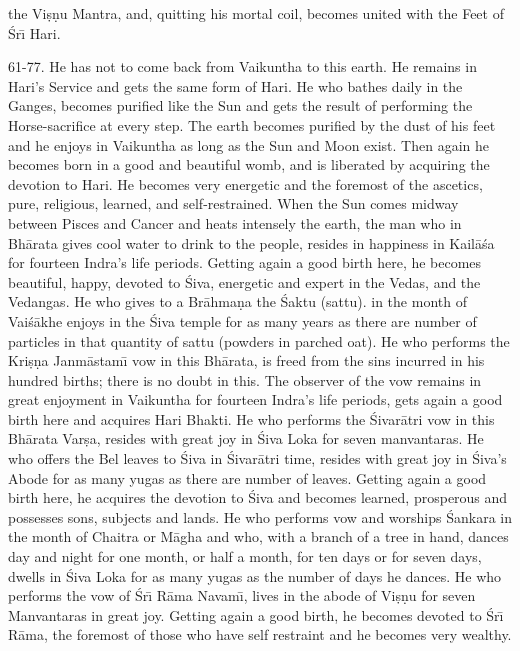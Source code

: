 the Vi\d{s}\d{n}u Mantra, and, quitting his mortal coil, becomes united with the Feet of \'Sr\={\i} Hari.

61-77. He has not to come back from Vaikuntha to this earth. He remains in Hari's Service and gets the same form of Hari. He who bathes daily in the Ganges, becomes purified like the Sun and gets the result of performing the Horse-sacrifice at every step. The earth becomes purified by the dust of his feet and he enjoys in Vaikuntha as long as the Sun and Moon exist. Then again he becomes born in a good and beautiful womb, and is liberated by acquiring the devotion to Hari. He becomes very energetic and the foremost of the ascetics, pure, religious, learned, and self-restrained. When the Sun comes midway between Pisces and Cancer and heats intensely the earth, the man who in Bh\=arata gives cool water to drink to the people, resides in happiness in Kail\=a\'sa for fourteen Indra's life periods. Getting again a good birth here, he becomes beautiful, happy, devoted to \'Siva, energetic and expert in the Vedas, and the Vedangas. He who gives to a Br\=ahma\d{n}a the \'Saktu (sattu). in the month of Vai\'s\=akhe enjoys in the \'Siva temple for as many years as there are number of particles in that quantity of sattu (powders in parched oat). He who performs the Kri\d{s}\d{n}a Janm\=astam\={\i} vow in this Bh\=arata, is freed from the sins incurred in his hundred births; there is no doubt in this. The observer of the vow remains in great enjoyment in Vaikuntha for fourteen Indra's life periods, gets again a good birth here and acquires Hari Bhakti. He who performs the \'Sivar\=atri vow in this Bh\=arata Var\d{s}a, resides with great joy in \'Siva Loka for seven manvantaras. He who offers the Bel leaves to \'Siva in \'Sivar\=atri time, resides with great joy in \'Siva's Abode for as many yugas as there are number of leaves. Getting again a good birth here, he acquires the devotion to \'Siva and becomes learned, prosperous and possesses sons, subjects and lands. He who performs vow and worships \'Sankara in the month of Chaitra or M\=agha and who, with a branch of a tree in hand, dances day and night for one month, or half a month, for ten days or for seven days, dwells in \'Siva Loka for as many yugas as the number of days he dances. He who performs the vow of \'Sr\={\i} R\=ama Navam\={\i}, lives in the abode of Vi\d{s}\d{n}u for seven Manvantaras in great joy. Getting again a good birth, he becomes devoted to \'Sr\={\i} R\=ama, the foremost of those who have self restraint and he becomes very wealthy.

